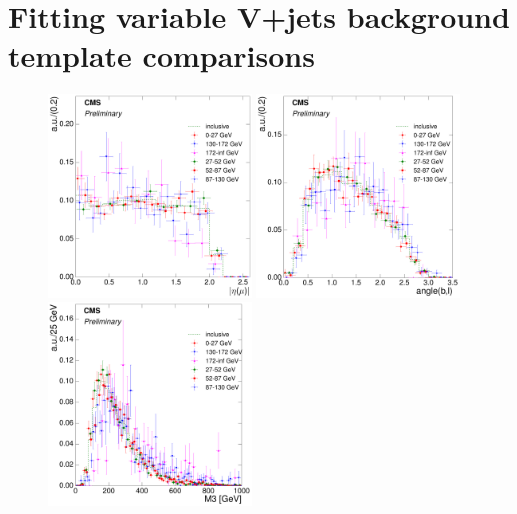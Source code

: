 \clearpage


\section{Fitting variable V+jets background template comparisons}
\label{as:fitting_variable_vjets_template_comparisons}

\begin{figure}[hbtp]
    \centering
     \includegraphics[width=0.48\textwidth]{Chapters/04_Analysis/04b_XSections/images/8TeV/fit_variables/muon/MET/muon_absolute_eta/vjets/MET_muon_absolute_eta_2orMoreBtags_VJets_template_comparison.pdf}\hfill
     \includegraphics[width=0.48\textwidth]{Chapters/04_Analysis/04b_XSections/images/8TeV/fit_variables/muon/MET/angle_bl/vjets/MET_angle_bl_2orMoreBtags_VJets_template_comparison.pdf}\\
     \includegraphics[width=0.48\textwidth]{Chapters/04_Analysis/04b_XSections/images/8TeV/fit_variables/muon/MET/M3/vjets/MET_M3_2orMoreBtags_VJets_template_comparison.pdf}\\

\end{figure}
